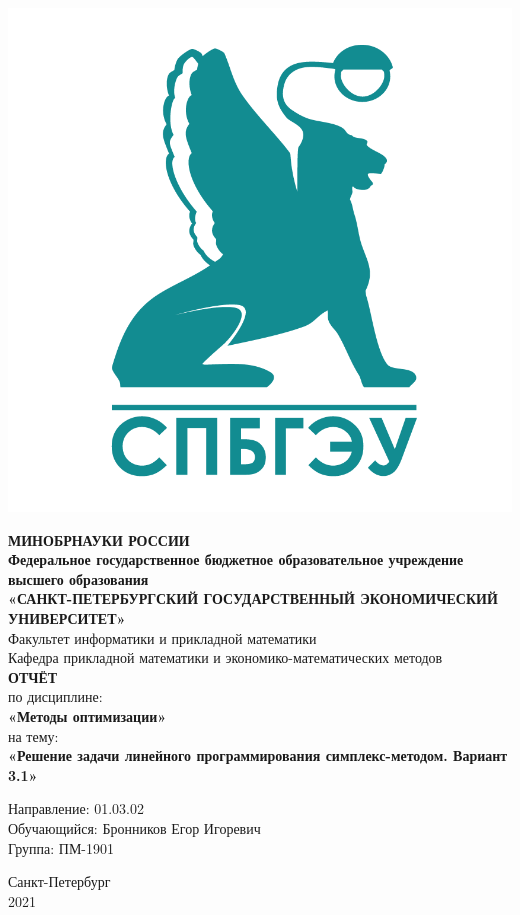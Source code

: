\documentclass[14pt,a4paper,fleqn]{extarticle}
\begin{document}
\begin{titlepage}
	\includegraphics[scale=0.12]{logo}
	\begin{center}
		\textbf{МИНОБРНАУКИ РОССИИ}\\
		\vspace{0.2cm}
		\textbf{Федеральное государственное бюджетное образовательное учреждение высшего образования}\\
		\textbf{«САНКТ-ПЕТЕРБУРГСКИЙ ГОСУДАРСТВЕННЫЙ ЭКОНОМИЧЕСКИЙ УНИВЕРСИТЕТ»}\\
		\vspace{0.6cm}
		Факультет информатики и прикладной математики\\
		Кафедра прикладной математики и экономико-математических методов\\
		\vspace{1cm}
		\textbf{ОТЧЁТ}\\
		по дисциплине:\\
		\textbf{«Методы оптимизации»}\\
		на тему:\\
		\textbf{«Решение задачи линейного программирования симплекс-методом. Вариант 3.1»}\\
	\end{center}
	\vspace{1cm}
	Направление: 01.03.02\\
	Обучающийся: Бронников Егор Игоревич\\
	Группа: ПМ-1901\\
	\vfill
	\begin{center}
		Санкт-Петербург\\
		2021\\
	\end{center}
\end{titlepage}
\end{document}
